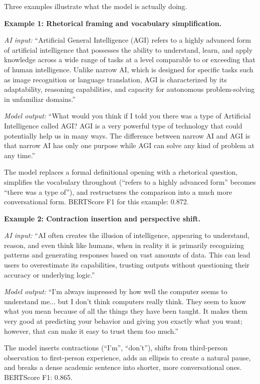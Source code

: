 \documentclass{article}
\begin{document}
Three examples illustrate what the model is actually doing.

\textbf{Example 1: Rhetorical framing and vocabulary simplification.}

\textit{AI input:} ``Artificial General Intelligence (AGI) refers to a highly advanced form of artificial intelligence that possesses the ability to understand, learn, and apply knowledge across a wide range of tasks at a level comparable to or exceeding that of human intelligence. Unlike narrow AI, which is designed for specific tasks such as image recognition or language translation, AGI is characterized by its adaptability, reasoning capabilities, and capacity for autonomous problem-solving in unfamiliar domains.''

\textit{Model output:} ``What would you think if I told you there was a type of Artificial Intelligence called AGI? AGI is a very powerful type of technology that could potentially help us in many ways. The difference between narrow AI and AGI is that narrow AI has only one purpose while AGI can solve any kind of problem at any time.''

The model replaces a formal definitional opening with a rhetorical question, simplifies the vocabulary throughout (``refers to a highly advanced form'' becomes ``there was a type of''), and restructures the comparison into a much more conversational form. BERTScore F1 for this example: 0.872.

\textbf{Example 2: Contraction insertion and perspective shift.}

\textit{AI input:} ``AI often creates the illusion of intelligence, appearing to understand, reason, and even think like humans, when in reality it is primarily recognizing patterns and generating responses based on vast amounts of data. This can lead users to overestimate its capabilities, trusting outputs without questioning their accuracy or underlying logic.''

\textit{Model output:} ``I'm always impressed by how well the computer seems to understand me... but I don't think computers really think. They seem to know what you mean because of all the things they have been taught. It makes them very good at predicting your behavior and giving you exactly what you want; however, that can make it easy to trust them too much.''

The model inserts contractions (``I'm'', ``don't''), shifts from third-person observation to first-person experience, adds an ellipsis to create a natural pause, and breaks a dense academic sentence into shorter, more conversational ones. BERTScore F1: 0.865.
\end{document}

